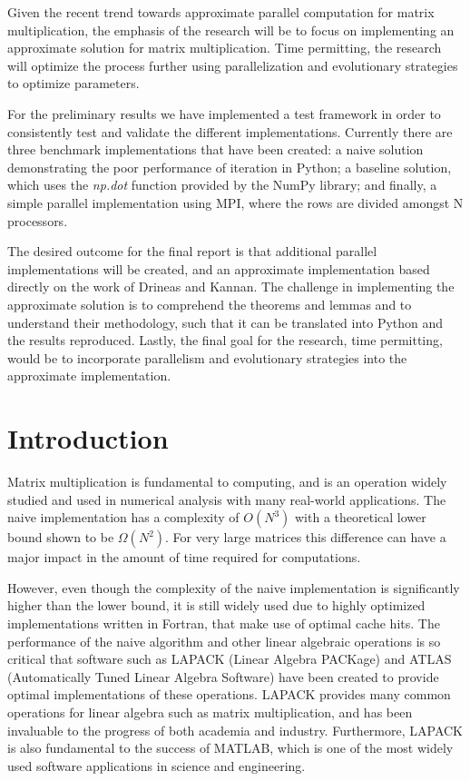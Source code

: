 \documentclass[oneside]{article}
\begin{document}
Given the recent trend towards approximate parallel computation for matrix multiplication, the emphasis of the research will be to focus on implementing an approximate solution for matrix multiplication. Time permitting, the research will optimize the process further using parallelization and evolutionary strategies to optimize parameters.

For the preliminary results we have implemented a test framework in order to consistently test and validate the different implementations. Currently there are three benchmark implementations that have been created: a naive solution demonstrating the poor performance of iteration in Python; a baseline solution, which uses the \emph{np.dot} function provided by the NumPy library; and finally, a simple parallel implementation using MPI, where the rows are divided amongst N processors.

The desired outcome for the final report is that additional parallel implementations will be created, and an approximate implementation based directly on the work of Drineas and Kannan\cite{drineas2001fast}. The challenge in implementing the approximate solution is to comprehend the theorems and lemmas and to understand their methodology, such that it can be translated into Python and the results reproduced. Lastly, the final goal for the research, time permitting, would be to incorporate parallelism and evolutionary strategies into the approximate implementation.



\section{Introduction}

Matrix multiplication is fundamental to computing, and is an operation widely studied and used in numerical analysis with many real-world applications. The naive implementation has a complexity of $O(N^{3})$\cite{raz2002complexity} with a theoretical lower bound shown to be $\Omega(N^{2})$\cite{raz2002complexity}. For very large matrices this difference can have a major impact in the amount of time required for computations.

However, even though the complexity of the naive implementation is significantly higher than the lower bound, it is still widely used due to highly optimized implementations written in Fortran, that make use of optimal cache hits\cite{note2002reducing}. The performance of the naive algorithm and other linear algebraic operations is so critical that software such as LAPACK (Linear Algebra PACKage)\cite{lapackweb} and ATLAS (Automatically Tuned Linear Algebra Software)\cite{whaley2001automated} have been created to provide optimal implementations of these operations. LAPACK provides many common operations for linear algebra such as matrix multiplication, and has been invaluable to the progress of both academia and industry. Furthermore, LAPACK is also fundamental to the success of MATLAB\cite{matlab2000}, which is one of the most widely used software applications in science and engineering.
\end{document}
